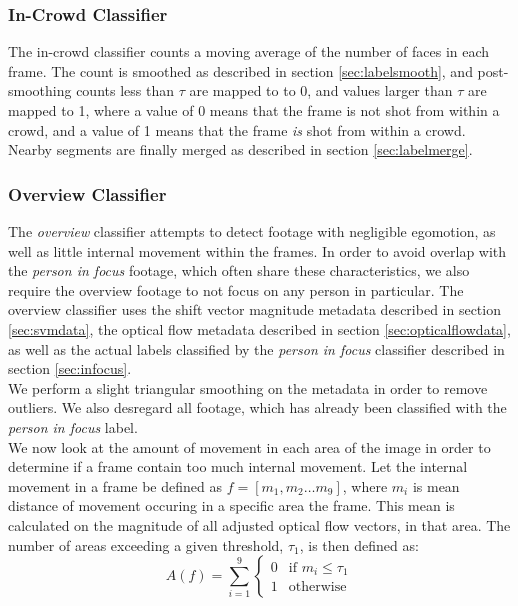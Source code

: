 \subsubsection{In-Crowd Classifier}\label{sec:incrowd}
%
The in-crowd classifier counts a moving average of the number of faces in each frame. The count is smoothed as described in section \ref{sec:labelsmooth}, and post-smoothing counts less than $\tau$ are mapped to to 0, and values larger than $\tau$ are mapped to 1, where a value of 0 means that the frame is not shot from within a crowd, and a value of 1 means that the frame \emph{is} shot from within a crowd. Nearby segments are finally merged as described in section \ref{sec:labelmerge}.
%
\subsubsection{Overview Classifier}\label{sec:overviewclassifier}
%
The \textit{overview} classifier attempts to detect footage with negligible egomotion, as well as little internal movement within the frames. In order to avoid overlap with the \textit{person in focus} footage, which often share these characteristics, we also require the overview footage to not focus on any person in particular. The overview classifier uses the shift vector magnitude metadata described in section \ref{sec:svmdata}, the optical flow metadata described in section \ref{sec:opticalflowdata}, as well as the actual labels classified by the \textit{person in focus} classifier described in section \ref{sec:infocus}.\\
We perform a slight triangular smoothing on the metadata in order to remove outliers. We also desregard all footage, which has already been classified with the \textit{person in focus} label.\\
We now look at the amount of movement in each area of the image in order to determine if a frame contain too much internal movement. Let the internal movement in a frame be defined as $f = [m_{1},m_{2} \dots m_{9}]$, where $m_{i}$ is mean distance of movement occuring in a specific area the frame. This mean is calculated on the magnitude of all adjusted optical flow vectors, in that area. The number of areas exceeding a given threshold, $\tau_{1}$, is then defined as:
%
\begin{equation}
A(f) = \sum_{i=1}^{9}
\begin{cases}
0 & \text{if } m_{i} \leq \tau_{1}\\
1 &  \text{otherwise}
\end{cases}
\end{equation}
